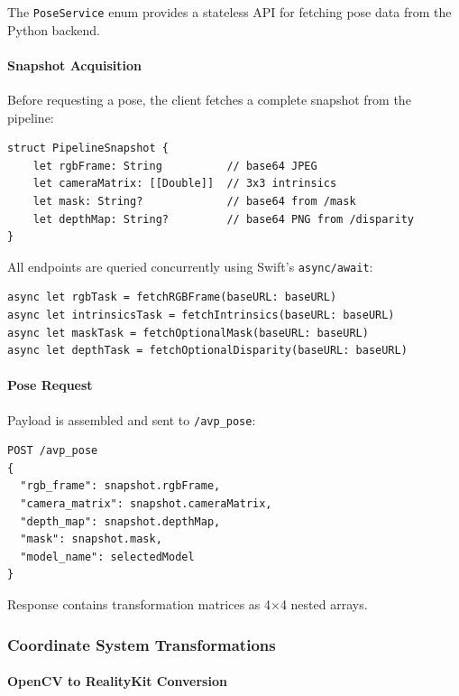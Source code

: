 The \texttt{PoseService} enum provides a stateless API for fetching pose data from the Python backend.

\paragraph{Snapshot Acquisition}

Before requesting a pose, the client fetches a complete snapshot from the pipeline:

\begin{verbatim}
struct PipelineSnapshot {
    let rgbFrame: String          // base64 JPEG
    let cameraMatrix: [[Double]]  // 3x3 intrinsics
    let mask: String?             // base64 from /mask
    let depthMap: String?         // base64 PNG from /disparity
}
\end{verbatim}

All endpoints are queried concurrently using Swift's \texttt{async/await}:

\begin{verbatim}
async let rgbTask = fetchRGBFrame(baseURL: baseURL)
async let intrinsicsTask = fetchIntrinsics(baseURL: baseURL)
async let maskTask = fetchOptionalMask(baseURL: baseURL)
async let depthTask = fetchOptionalDisparity(baseURL: baseURL)
\end{verbatim}

\paragraph{Pose Request}

Payload is assembled and sent to \texttt{/avp\_pose}:

\begin{verbatim}
POST /avp_pose
{
  "rgb_frame": snapshot.rgbFrame,
  "camera_matrix": snapshot.cameraMatrix,
  "depth_map": snapshot.depthMap,
  "mask": snapshot.mask,
  "model_name": selectedModel
}
\end{verbatim}

Response contains transformation matrices as 4×4 nested arrays.

\subsubsection{Coordinate System Transformations}

\paragraph{OpenCV to RealityKit Conversion}

